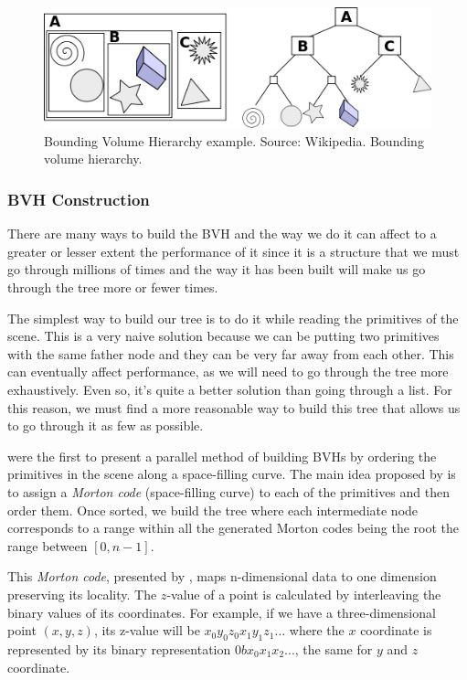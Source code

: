 \documentclass[titlepage,12pt]{report}
\begin{document}
\begin{figure}[H]
	\centering
	\includegraphics[scale=0.65]{media/BVH_example.png}
	\caption{Bounding Volume Hierarchy example. Source: Wikipedia. Bounding volume hierarchy.}
	\label{bvh1}
\end{figure}

\subsubsection{BVH Construction}

There are many ways to build the BVH and the way we do it can affect to a greater or lesser extent the performance of it since it is a structure that we must go through millions of times and the way it has been built will make us go through the tree more or fewer times.

The simplest way to build our tree is to do it while reading the primitives of the scene.  This is a very naive solution because we can be putting two primitives with the same father node and they can be very far away from each other. This can eventually affect performance, as we will need to go through the tree more exhaustively. Even so, it's quite a better solution than going through a list. For this reason, we must find a more reasonable way to build this tree that allows us to go through it as few as possible.

\citep[p.~375--384]{Lauterbach2009} were the first to present a parallel method of building BVHs by ordering the primitives in the scene along a space-filling curve. The main idea proposed by \citep[p.~375--384]{Lauterbach2009} is to assign a \textit{Morton code} (space-filling curve) to each of the primitives and then order them. Once sorted, we build the tree where each intermediate node corresponds to a range within all the generated Morton codes being the root the range between $[0, n-1]$.

This \textit{Morton code}, presented by \citep{Morton1966ACO}, maps n-dimensional data to one dimension preserving its locality. The $z$-value of a point is calculated by interleaving the binary values of its coordinates. For example, if we have a three-dimensional point $(x,y,z)$, its z-value will be $x_0y_0z_0x_1y_1z_1...$ where the $x$ coordinate is represented by its binary representation $0bx_0x_1x_2...$, the same for $y$ and $z$ coordinate.
\end{document}
